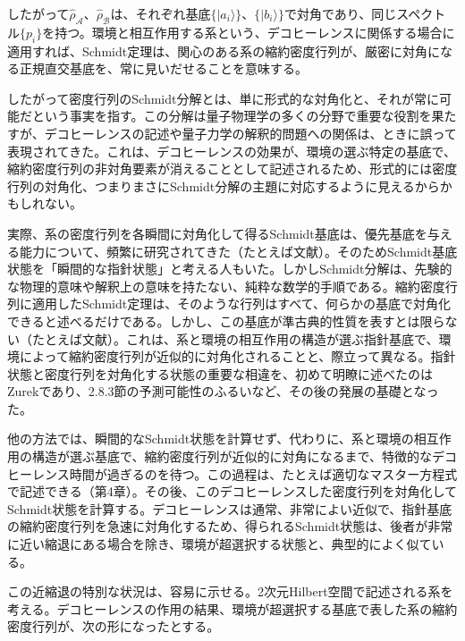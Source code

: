 \hypertarget{srcpage:105}{}\label{srcpage:105}
したがって$\hat\rho_{\mathcal A}$、$\hat\rho_{\mathcal B}$は、それぞれ基底$\{\lvert a_i\rangle\}$、$\{\lvert b_i\rangle\}$で対角であり、同じスペクトル$\{p_i\}$を持つ。環境と相互作用する系という、デコヒーレンスに関係する場合に適用すれば、Schmidt定理は、関心のある系の縮約密度行列が、厳密に対角になる正規直交基底を、常に見いだせることを意味する。

したがって密度行列のSchmidt分解とは、単に形式的な対角化と、それが常に可能だという事実を指す。この分解は量子物理学の多くの分野で重要な役割を果たすが、デコヒーレンスの記述や量子力学の解釈的問題への関係は、ときに誤って表現されてきた。これは、デコヒーレンスの効果が、環境の選ぶ特定の基底で、縮約密度行列の非対角要素が消えることとして記述されるため、形式的には密度行列の対角化、つまりまさにSchmidt分解の主題に対応するように見えるからかもしれない。

実際、系の密度行列を各瞬間に対角化して得るSchmidt基底は、優先基底を与える能力について、頻繁に研究されてきた（たとえば文献\cite{ref005,ref006,ref145,ref146}）。そのためSchmidt基底状態を「瞬間的な指針状態」と考える人もいた\cite{ref145}。しかしSchmidt分解は、先験的な物理的意味や解釈上の意味を持たない、純粋な数学的手順である。縮約密度行列に適用したSchmidt定理は、そのような行列はすべて、何らかの基底で対角化できると述べるだけである。しかし、この基底が準古典的性質を表すとは限らない（たとえば文献\cite{ref147,ref148}）。これは、系と環境の相互作用の構造が選ぶ指針基底で、環境によって縮約密度行列が近似的に対角化されることと、際立って異なる。指針状態と密度行列を対角化する状態の重要な相違を、初めて明瞭に述べたのはZurek\cite{ref008}であり、2.8.3節の予測可能性のふるいなど、その後の発展の基礎となった。

他の方法では、瞬間的なSchmidt状態を計算せず、代わりに、系と環境の相互作用の構造が選ぶ基底で、縮約密度行列が近似的に対角になるまで、特徴的なデコヒーレンス時間が過ぎるのを待つ。この過程は、たとえば適切なマスター方程式で記述できる（第4章）。その後、このデコヒーレンスした密度行列を対角化してSchmidt状態を計算する。デコヒーレンスは通常、非常によい近似で、指針基底の縮約密度行列を急速に対角化するため、得られるSchmidt状態は、後者が非常に近い縮退にある場合を除き、環境が超選択する状態と、典型的によく似ている。

この近縮退の特別な状況は、容易に示せる\cite{ref146}。2次元Hilbert空間で記述される系を考える。デコヒーレンスの作用の結果、環境が超選択する基底で表した系の縮約密度行列が、次の形になったとする。


